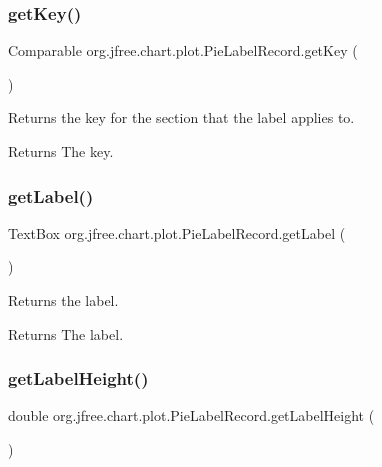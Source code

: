 \subsubsection{\texorpdfstring{get\+Key()}{getKey()}}
{\footnotesize\ttfamily Comparable org.\+jfree.\+chart.\+plot.\+Pie\+Label\+Record.\+get\+Key (\begin{DoxyParamCaption}{ }\end{DoxyParamCaption})}

Returns the key for the section that the label applies to.

\begin{DoxyReturn}{Returns}
The key. 
\end{DoxyReturn}
\mbox{\label{classorg_1_1jfree_1_1chart_1_1plot_1_1_pie_label_record_a9287b0c186570cc2736669744623aadd}} 
\subsubsection{\texorpdfstring{get\+Label()}{getLabel()}}
{\footnotesize\ttfamily Text\+Box org.\+jfree.\+chart.\+plot.\+Pie\+Label\+Record.\+get\+Label (\begin{DoxyParamCaption}{ }\end{DoxyParamCaption})}

Returns the label.

\begin{DoxyReturn}{Returns}
The label. 
\end{DoxyReturn}
\mbox{\label{classorg_1_1jfree_1_1chart_1_1plot_1_1_pie_label_record_a88b958aeeeccf35eaccc72980e0b1709}} 
\subsubsection{\texorpdfstring{get\+Label\+Height()}{getLabelHeight()}}
{\footnotesize\ttfamily double org.\+jfree.\+chart.\+plot.\+Pie\+Label\+Record.\+get\+Label\+Height (\begin{DoxyParamCaption}{ }\end{DoxyParamCaption})}

